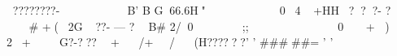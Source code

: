  ????????- B'	B%
G  66.6H"   
04+   HH???- ?      #%
 + (2G??- --- ?    B#%
2/0      ;;     0+
)
2+G?-???  	%
+/+/(H?????? '	'	#####=	'	'	%
